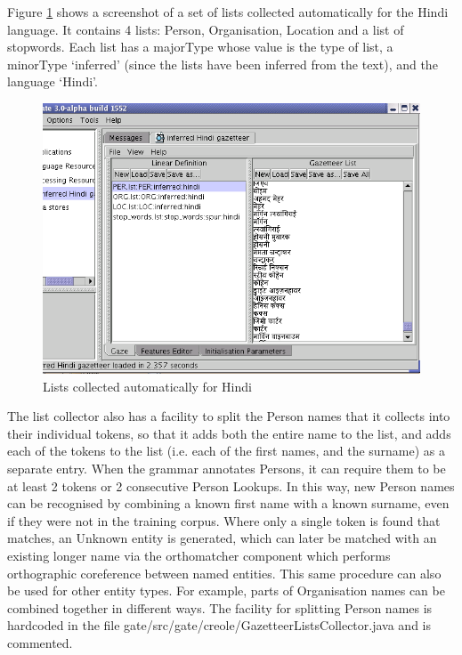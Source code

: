 Figure \ref{fig:list_collector_snapshot} shows a screenshot of a set of lists
collected automatically for the Hindi language. It contains 4 lists: Person,
Organisation, Location and a list of stopwords. Each list has a majorType whose
value is the type of list, a minorType `inferred' (since the lists have been
inferred from the text), and the language `Hindi'.
\begin{figure}[htbp]
\begin{center}
\includegraphics[scale=0.5]{list_collector_snapshot.png}
\end{center}
\caption{Lists collected automatically for Hindi}
\label{fig:list_collector_snapshot}
\end{figure}


The list collector also has a facility to split the Person names that it
collects into their individual tokens, so that it adds both the entire name to
the list, and adds each of the tokens to the list (i.e. each of the first names,
and the surname) as a separate entry. When the grammar annotates Persons, it can
require them to be at least 2 tokens or 2 consecutive Person Lookups. In this
way, new Person names can be recognised by combining a known first name with a
known surname, even if they were not in the training corpus. Where only a single
token is found that matches, an Unknown entity is generated, which can later be
matched with an existing longer name via the orthomatcher component which
performs orthographic coreference between named entities. This same procedure
can also be used for other entity types. For example, parts of Organisation
names can be combined together in different ways. The facility for splitting
Person names is hardcoded in the file
gate/src/gate/creole/GazetteerListsCollector.java and is commented.

